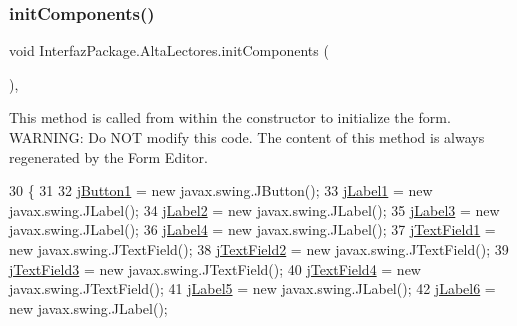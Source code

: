 \subsubsection{\texorpdfstring{init\+Components()}{initComponents()}}
{\footnotesize\ttfamily void Interfaz\+Package.\+Alta\+Lectores.\+init\+Components (\begin{DoxyParamCaption}{ }\end{DoxyParamCaption})\hspace{0.3cm}{\ttfamily [inline]}, {\ttfamily [private]}}

This method is called from within the constructor to initialize the form. W\+A\+R\+N\+I\+NG\+: Do N\+OT modify this code. The content of this method is always regenerated by the Form Editor. 
\begin{DoxyCode}
30                                   \{
31 
32         \mbox{\hyperlink{class_interfaz_package_1_1_alta_lectores_a022b628c2a9a98d3d2e05f2776bad642}{jButton1}} = \textcolor{keyword}{new} javax.swing.JButton();
33         \mbox{\hyperlink{class_interfaz_package_1_1_alta_lectores_a3c66bd5bf27274226564fa37c644c9e7}{jLabel1}} = \textcolor{keyword}{new} javax.swing.JLabel();
34         \mbox{\hyperlink{class_interfaz_package_1_1_alta_lectores_adfb75b51296b24b4165ef9d2ffe4e9fd}{jLabel2}} = \textcolor{keyword}{new} javax.swing.JLabel();
35         \mbox{\hyperlink{class_interfaz_package_1_1_alta_lectores_a8540271f20afc2b5d9e7b8ece4ec5e93}{jLabel3}} = \textcolor{keyword}{new} javax.swing.JLabel();
36         \mbox{\hyperlink{class_interfaz_package_1_1_alta_lectores_a39c95238a43795188e9eeeafa177e0c8}{jLabel4}} = \textcolor{keyword}{new} javax.swing.JLabel();
37         \mbox{\hyperlink{class_interfaz_package_1_1_alta_lectores_ac08649a21b3eae20582e25d3fb7a1ed9}{jTextField1}} = \textcolor{keyword}{new} javax.swing.JTextField();
38         \mbox{\hyperlink{class_interfaz_package_1_1_alta_lectores_a3f30dbff470e9749421774f5da8d8833}{jTextField2}} = \textcolor{keyword}{new} javax.swing.JTextField();
39         \mbox{\hyperlink{class_interfaz_package_1_1_alta_lectores_a1043b2ff62e3dcae79fb652d7891a131}{jTextField3}} = \textcolor{keyword}{new} javax.swing.JTextField();
40         \mbox{\hyperlink{class_interfaz_package_1_1_alta_lectores_a933106873681982ae326743f58efd3d5}{jTextField4}} = \textcolor{keyword}{new} javax.swing.JTextField();
41         \mbox{\hyperlink{class_interfaz_package_1_1_alta_lectores_a59070bf77faf3741fbd2648451cd3075}{jLabel5}} = \textcolor{keyword}{new} javax.swing.JLabel();
42         \mbox{\hyperlink{class_interfaz_package_1_1_alta_lectores_a8af45e7375fe9c6f739b4d5bc09bb983}{jLabel6}} = \textcolor{keyword}{new} javax.swing.JLabel();

\end{DoxyCode}
